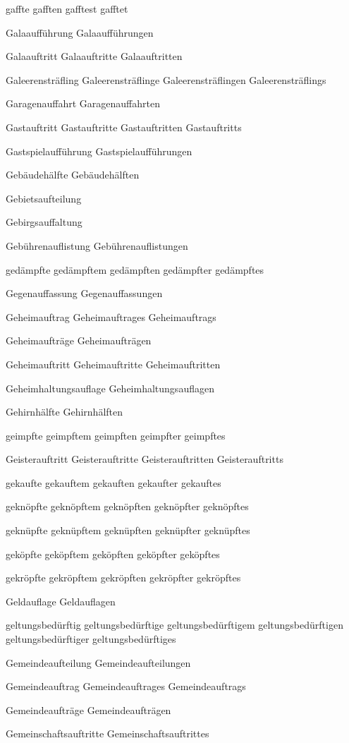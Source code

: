 gaffte
gafften
gafftest
gafftet

Galaaufführung
Galaaufführungen

Galaauftritt
Galaauftritte
Galaauftritten

Galeerensträfling
Galeerensträflinge
Galeerensträflingen
Galeerensträflings

Garagenauffahrt
Garagenauffahrten

Gastauftritt
Gastauftritte
Gastauftritten
Gastauftritts

Gastspielaufführung
Gastspielaufführungen

Gebäudehälfte
Gebäudehälften

Gebietsaufteilung

Gebirgsauffaltung

Gebührenauflistung
Gebührenauflistungen

gedämpfte
gedämpftem
gedämpften
gedämpfter
gedämpftes

Gegenauffassung
Gegenauffassungen

Geheimauftrag
Geheimauftrages
Geheimauftrags

Geheimaufträge
Geheimaufträgen

Geheimauftritt
Geheimauftritte
Geheimauftritten

Geheimhaltungsauflage
Geheimhaltungsauflagen

Gehirnhälfte
Gehirnhälften

geimpfte
geimpftem
geimpften
geimpfter
geimpftes

Geisterauftritt
Geisterauftritte
Geisterauftritten
Geisterauftritts

gekaufte
gekauftem
gekauften
gekaufter
gekauftes

geknöpfte
geknöpftem
geknöpften
geknöpfter
geknöpftes

geknüpfte
geknüpftem
geknüpften
geknüpfter
geknüpftes

geköpfte
geköpftem
geköpften
geköpfter
geköpftes

gekröpfte
gekröpftem
gekröpften
gekröpfter
gekröpftes

Geldauflage
Geldauflagen

geltungsbedürftig
geltungsbedürftige
geltungsbedürftigem
geltungsbedürftigen
geltungsbedürftiger
geltungsbedürftiges

Gemeindeaufteilung
Gemeindeaufteilungen

Gemeindeauftrag
Gemeindeauftrages
Gemeindeauftrags

Gemeindeaufträge
Gemeindeaufträgen

Gemeinschaftsauftritte
Gemeinschaftsauftrittes

